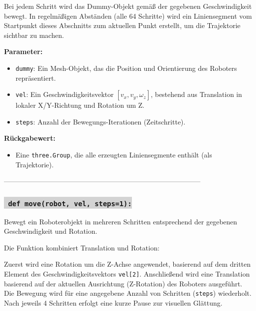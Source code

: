 Bei jedem Schritt wird das Dummy-Objekt gemäß der gegebenen Geschwindigkeit bewegt. In regelmäßigen Abständen (alle 64 Schritte) wird ein Liniensegment vom Startpunkt dieses Abschnitts zum aktuellen Punkt erstellt, um die Trajektorie sichtbar zu machen.

\noindent \textbf{Parameter:} \vspace{-6ex} \\
\begin{itemize}
    \setlength{\itemindent}{1em}
    \item \texttt{dummy}: Ein Mesh-Objekt, das die Position und Orientierung des Roboters repräsentiert.
    \item \texttt{vel}: Ein Geschwindigkeitsvektor \([v_x, v_y, \omega_z]\), bestehend aus Translation in lokaler X/Y-Richtung und Rotation um Z.
    \item \texttt{steps}: Anzahl der Bewegungs-Iterationen (Zeitschritte).
\end{itemize}

\noindent \textbf{Rückgabewert:} \vspace{-6ex} \\
\begin{itemize}
    \setlength{\itemindent}{1em}
    \item Eine \texttt{three.Group}, die alle erzeugten Liniensegmente enthält (als Trajektorie).
\end{itemize}

--------------------------------------------------------------------------------------


\subsubsection*{\colorbox{lightgray}{\texttt{\textbf{\color{green} def} \color{blue} move}\textbf{\texttt{(robot, vel, steps=1):}}}}
Bewegt ein Roboterobjekt in mehreren Schritten entsprechend der gegebenen Geschwindigkeit und Rotation.

Die Funktion kombiniert Translation und Rotation:

Zuerst wird eine Rotation um die Z-Achse angewendet, basierend auf dem dritten Element des Geschwindigkeitsvektors \texttt{vel[2]}.
Anschließend wird eine Translation basierend auf der aktuellen Ausrichtung (Z-Rotation) des Roboters ausgeführt.
Die Bewegung wird für eine angegebene Anzahl von Schritten (\texttt{steps}) wiederholt.
Nach jeweils 4 Schritten erfolgt eine kurze Pause zur visuellen Glättung.

